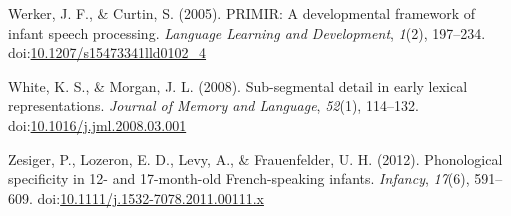 \documentclass[man]{apa6}
\begin{document}
\leavevmode\hypertarget{ref-Werker2005}{}%
Werker, J. F., \& Curtin, S. (2005). PRIMIR: A developmental framework of infant speech processing. \emph{Language Learning and Development}, \emph{1}(2), 197--234. doi:\href{https://doi.org/10.1207/s15473341lld0102_4}{10.1207/s15473341lld0102\_4}

\leavevmode\hypertarget{ref-White2008}{}%
White, K. S., \& Morgan, J. L. (2008). Sub-segmental detail in early lexical representations. \emph{Journal of Memory and Language}, \emph{52}(1), 114--132. doi:\href{https://doi.org/10.1016/j.jml.2008.03.001}{10.1016/j.jml.2008.03.001}

\leavevmode\hypertarget{ref-Zesiger2012}{}%
Zesiger, P., Lozeron, E. D., Levy, A., \& Frauenfelder, U. H. (2012). Phonological specificity in 12- and 17-month-old French-speaking infants. \emph{Infancy}, \emph{17}(6), 591--609. doi:\href{https://doi.org/10.1111/j.1532-7078.2011.00111.x}{10.1111/j.1532-7078.2011.00111.x}

\endgroup
\end{document}

